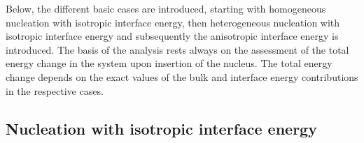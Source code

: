 Below, the different basic cases are introduced, starting with homogeneous nucleation with isotropic interface energy, then heterogeneous nucleation with isotropic interface energy and subsequently the anisotropic interface energy is introduced. The basis of the analysis rests always on the assessment of the total energy change in the system upon insertion of the nucleus. The total energy change depends on the exact values of the bulk and interface energy contributions in the respective cases. 


    \subsection{Nucleation with isotropic interface energy}
